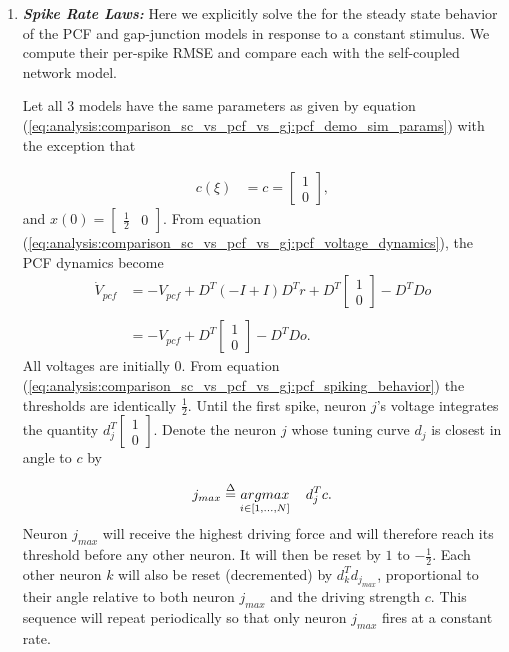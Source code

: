 \begin{enumerate}
\clearpage

\item \textbf{\textit{Spike Rate Laws:}} Here we explicitly solve the for the steady state behavior of the PCF and gap-junction models in response to a constant stimulus. We compute their per-spike RMSE and compare each with the self-coupled network model. 

Let all 3 models have the same parameters as given by equation (\ref{eq:analysis:comparison_sc_vs_pcf_vs_gj:pcf_demo_sim_params}) with the exception that 

\begin{align*}
	c(\xi) &= c = 
	\begin{bmatrix}
		1 \\ 0	
	\end{bmatrix}, 
\end{align*}
and
$x(0) = \begin{bmatrix} \frac{1}{2} & 0 \end{bmatrix}$. From equation (\ref{eq:analysis:comparison_sc_vs_pcf_vs_gj:pcf_voltage_dynamics}), the PCF dynamics become
\begin{align*}
	\dot{V}_{pcf}
	&=
	- V_{pcf}
	+
	D^T 
	\left(
		-I + I
	\right)
	D^T r
	+
	D^T 
	\begin{bmatrix}
		1 \\ 0
	\end{bmatrix}
	-
	D^T D o
	\\
	\\
	&= 
	-V_{pcf}
	+ 
	D^T 
	\begin{bmatrix}
		1 \\ 0
	\end{bmatrix}
	-
	D^T D o.
\end{align*}
All voltages are initially 0. From equation (\ref{eq:analysis:comparison_sc_vs_pcf_vs_gj:pcf_spiking_behavior}) the thresholds are identically $\frac{1}{2}$. Until the first spike, neuron $j$'s voltage integrates the quantity $d_j^T 	\begin{bmatrix}	1 \\ 0	\end{bmatrix}$. Denote the neuron $j$ whose tuning curve $d_j$ is closest in angle to $c$ by 

\begin{align*}
	j_{max} \overset{\Delta}{=}
	 \underset{
	 	i \in 
	 	\left[
	 		1, \ldots, N
	 	\right]
	 }
	 {argmax}
	 \hspace{4mm}
	 	d_j^T c.
\end{align*}
Neuron $j_{max}$ will receive the highest driving force and will therefore reach its threshold  before any other neuron. It will then be reset by $1$ to $- \frac{1}{2}$. Each other neuron $k$ will also be reset (decremented) by $d_k^T d_{j_{max}}$, proportional to their angle relative to both neuron $j_{max}$ and the driving strength $c$. This sequence will repeat periodically so that only neuron $j_{max}$ fires at a constant rate. 


\end{enumerate}
